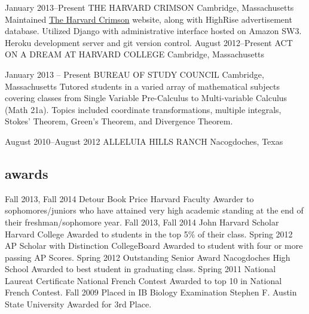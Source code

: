 \documentclass[]{friggeri-cv} %
\begin{document}
\begin{detailed}
\entry
{January 2013--Present}
{THE HARVARD CRIMSON}
{Cambridge, Massachusetts}
{
{Maintained \href{http://thecrimson.com}{The Harvard Crimson} website, along with HighRise advertisement database. Utilized Django with administrative interface hosted on Amazon SW3. Heroku development server and git version control.}}
\entry
{August 2012--Present}
{ACT ON A DREAM AT HARVARD COLLEGE}
{Cambridge, Massachusetts}
{}

\entry
{January 2013 -- Present}
{BUREAU OF STUDY COUNCIL}
{Cambridge, Massachusetts}
{
{Tutored students in a varied array of mathematical subjects covering classes from Single Variable Pre-Calculus to Multi-variable Calculus (Math 21a). Topics included coordinate transformations, multiple integrals, Stokes' Theorem, Green's Theorem, and Divergence Theorem.}}

\entry
{August 2010--August 2012}
{ALLELUIA HILLS RANCH}
{Nacogdoches, Texas}
{}
\end{detailed}

\begin{detailed}
\section{awards}

\begin{entrylist}
\entry
{Fall 2013, Fall 2014}
{Detour Book Price}
{Harvard Faculty}
{Awarder to sophomores/juniors who have attained very high academic standing at the end of their freshman/sophomore year.}
\entry
{Fall 2013, Fall 2014}
{John Harvard Scholar}
{Harvard College}
{Awarded to students in the top 5\% of their class.}
\entry
{Spring 2012}
{AP Scholar with Distinction}
{CollegeBoard}
{Awarded to student with four or more passing AP Scores.}
\entry
{Spring 2012}
{Outstanding Senior Award}
{Nacogdoches High School}
{Awarded to best student in graduating class.}
\entry
{Spring 2011}
{National Laureat Certificate}
{National French Contest}
{Awarded to top 10 in National French Contest.}
\entry
{Fall 2009}
{Placed in IB Biology Examination}
{Stephen F. Austin State University}
{Awarded for 3rd Place.}
\end{entrylist}
\end{detailed}
\end{document}
